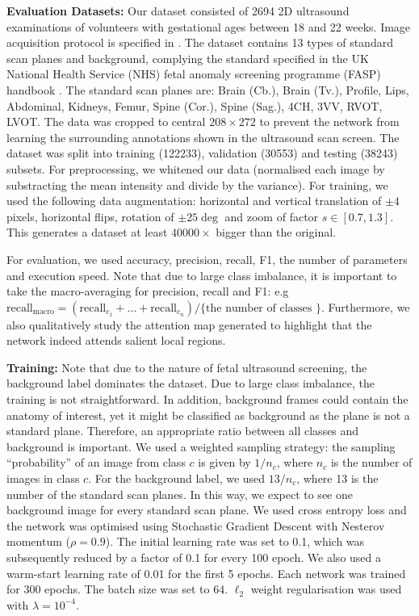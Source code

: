 \documentclass{article}
\begin{document}
\textbf{Evaluation Datasets:} Our dataset consisted of 2694 2D ultrasound examinations of volunteers with gestational ages between 18 and 22 weeks. Image acquisition protocol is specified in \cite{baumgartner2016real}. The dataset contains 13 types of standard scan planes and background, complying the standard specified in the UK National Health Service (NHS) fetal anomaly screening programme (FASP) handbook \cite{FASP}. The standard scan planes are: Brain (Cb.), Brain (Tv.), Profile, Lips, Abdominal, Kidneys, Femur, Spine (Cor.), Spine (Sag.), 4CH, 3VV, RVOT, LVOT. The data was cropped to central $208 \times 272$ to prevent the network from learning the surrounding annotations shown in the ultrasound scan screen. The dataset was split into training (122233), validation (30553) and testing (38243) subsets. For preprocessing, we whitened our data (normalised each image by substracting the mean intensity and divide by the variance). For training, we used the following data augmentation: horizontal and vertical translation of $\pm 4$ pixels, horizontal flips, rotation of $\pm 25 \deg$ and zoom of factor $s \in [0.7, 1.3]$. This  generates a dataset at least $40000\times$ bigger than the original.

For evaluation, we used accuracy, precision, recall, F1, the number of parameters and execution speed. Note that due to large class imbalance, it is important to take the macro-averaging for precision, recall and F1: e.g $\text{recall}_\text{macro} = (\text{recall}_{c_1} +  \dots +  \text{recall}_{c_n})/\text{\{ the number of classes \}}$. Furthermore, we also qualitatively study the attention map generated to highlight that the network indeed attends salient local regions.

\textbf{Training:} Note that due to the nature of fetal ultrasound screening, the background label dominates the dataset. Due to large class imbalance, the training is not straightforward. In addition, background frames could contain the anatomy of interest, yet it might be classified as background as the plane is not a standard plane. Therefore, an appropriate ratio between all classes and background is important. We used a weighted sampling strategy: the sampling ``probability'' of an image from class $c$ is given by $1/n_c$, where $n_c$ is the number of images in class $c$. For the background label, we used $13/n_c$, where 13 is the number of the standard scan planes. In this way, we expect to see one background image for every standard scan plane. We used cross entropy loss and the network was optimised using Stochastic Gradient Descent with Nesterov momentum ($\rho=0.9$). The initial learning rate was set to 0.1, which was subsequently reduced by a factor of 0.1 for every 100 epoch. We also used a warm-start learning rate of 0.01 for the first 5 epochs. Each network was trained for 300 epochs. The batch size was set to 64. $\ell_2$ weight regularisation was used with $\lambda = 10^{-4}$.
\end{document}
